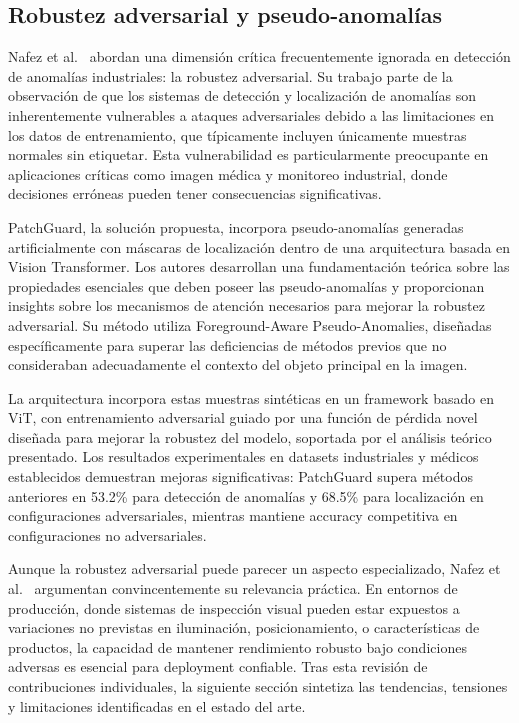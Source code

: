 \subsection{Robustez adversarial y pseudo-anomalías}

Nafez et al.~\cite{nafez2025patchguard} abordan una dimensión crítica frecuentemente ignorada en detección de anomalías industriales: la robustez adversarial. Su trabajo parte de la observación de que los sistemas de detección y localización de anomalías son inherentemente vulnerables a ataques adversariales debido a las limitaciones en los datos de entrenamiento, que típicamente incluyen únicamente muestras normales sin etiquetar. Esta vulnerabilidad es particularmente preocupante en aplicaciones críticas como imagen médica y monitoreo industrial, donde decisiones erróneas pueden tener consecuencias significativas.

PatchGuard, la solución propuesta, incorpora pseudo-anomalías generadas artificialmente con máscaras de localización dentro de una arquitectura basada en Vision Transformer. Los autores desarrollan una fundamentación teórica sobre las propiedades esenciales que deben poseer las pseudo-anomalías y proporcionan insights sobre los mecanismos de atención necesarios para mejorar la robustez adversarial. Su método utiliza Foreground-Aware Pseudo-Anomalies, diseñadas específicamente para superar las deficiencias de métodos previos que no consideraban adecuadamente el contexto del objeto principal en la imagen.

La arquitectura incorpora estas muestras sintéticas en un framework basado en ViT, con entrenamiento adversarial guiado por una función de pérdida novel diseñada para mejorar la robustez del modelo, soportada por el análisis teórico presentado. Los resultados experimentales en datasets industriales y médicos establecidos demuestran mejoras significativas: PatchGuard supera métodos anteriores en 53.2\% para detección de anomalías y 68.5\% para localización en configuraciones adversariales, mientras mantiene accuracy competitiva en configuraciones no adversariales.

Aunque la robustez adversarial puede parecer un aspecto especializado, Nafez et al.~\cite{nafez2025patchguard} argumentan convincentemente su relevancia práctica. En entornos de producción, donde sistemas de inspección visual pueden estar expuestos a variaciones no previstas en iluminación, posicionamiento, o características de productos, la capacidad de mantener rendimiento robusto bajo condiciones adversas es esencial para deployment confiable. Tras esta revisión de contribuciones individuales, la siguiente sección sintetiza las tendencias, tensiones y limitaciones identificadas en el estado del arte.

